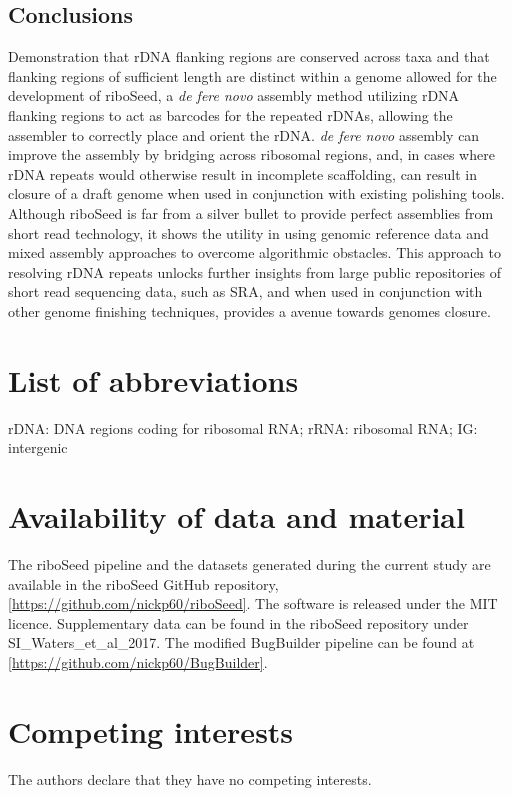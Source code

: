 \documentclass[11pt]{article}
\begin{document}
\begin{linenumbers}
\section*{Conclusions}
Demonstration that rDNA flanking regions are conserved across taxa and that flanking regions of sufficient length are distinct within a genome allowed for the development of riboSeed, a \textit{de fere novo} assembly method utilizing rDNA flanking regions to act as barcodes for the repeated rDNAs, allowing the assembler to correctly place and orient the rDNA. \textit{de fere novo} assembly can improve the assembly by bridging across ribosomal regions, and, in cases where rDNA repeats would otherwise result in incomplete scaffolding, can result in closure of a draft genome when used in conjunction with existing polishing tools. Although riboSeed is far from a silver bullet to provide perfect assemblies from short read technology, it shows the utility in using genomic reference data and mixed assembly approaches to overcome algorithmic obstacles. This approach to resolving rDNA repeats unlocks further insights from large public repositories of short read sequencing data, such as SRA, and when used in conjunction with other genome finishing techniques, provides a avenue towards genomes closure.

\end{linenumbers}
\baselineskip13pt

\section*{List of abbreviations}
rDNA: DNA regions coding for ribosomal RNA; rRNA: ribosomal RNA; IG: intergenic


\section*{Availability of data and material}
The riboSeed pipeline and the datasets generated during the current study are available in the riboSeed GitHub repository, \ref{https://github.com/nickp60/riboSeed}. The software is released under the MIT licence. Supplementary data can be found in the riboSeed repository under SI\_Waters\_et\_al\_2017. The modified BugBuilder pipeline can be found at \ref{https://github.com/nickp60/BugBuilder}.

\section*{Competing interests}
The authors declare that they have no competing interests.
\end{document}
